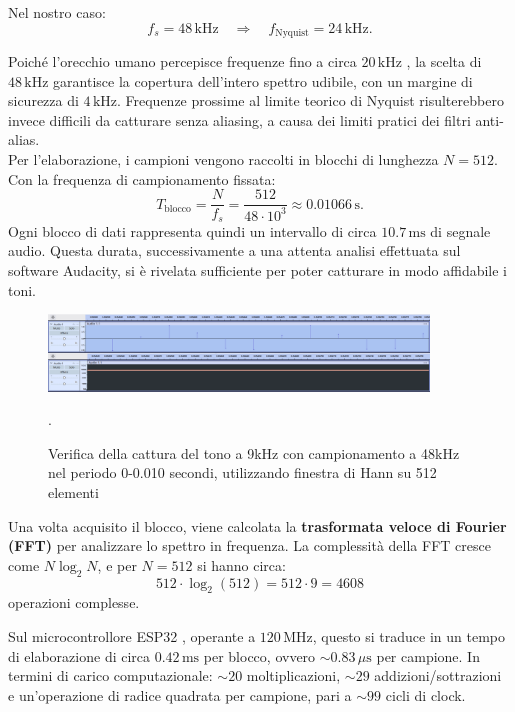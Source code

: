 Nel nostro caso:
\[
f_s = 48\,\text{kHz} \quad \Rightarrow \quad f_{\text{Nyquist}} = 24\,\text{kHz}.
\]

Poiché l’orecchio umano percepisce frequenze fino a circa $20\,\text{kHz}$ \cite{zwicker1999psychoacoustics}, la scelta di $48\,\text{kHz}$ garantisce la copertura dell’intero spettro udibile, con un margine di sicurezza di $4\,\text{kHz}$. Frequenze prossime al limite teorico di Nyquist risulterebbero invece difficili da catturare senza aliasing, a causa dei limiti pratici dei filtri anti-alias. \\

\noindent
Per l’elaborazione, i campioni vengono raccolti in blocchi di lunghezza $N = 512$. Con la frequenza di campionamento fissata:
\[
T_{\text{blocco}} = \frac{N}{f_s} = \frac{512}{48 \cdot 10^3} \approx 0.01066\,\text{s}.
\]
Ogni blocco di dati rappresenta quindi un intervallo di circa $10.7\,\text{ms}$ di segnale audio.  
Questa durata, successivamente a una attenta analisi effettuata sul software Audacity, si è rivelata sufficiente per poter catturare in modo affidabile i toni.
\begin{figure}[H]
    \centering
    \includegraphics[width=0.9\textwidth]{immagini/audacity_spectrum.png}
    \caption{Verifica della cattura del tono a 9kHz con campionamento a 48kHz nel periodo 0-0.010 secondi, utilizzando finestra di Hann su 512 elementi}.
    \label{fig:spettro_audacity}
\end{figure}



\noindent
Una volta acquisito il blocco, viene calcolata la \textbf{trasformata veloce di Fourier (FFT)} \cite{cooley1965fft} per analizzare lo spettro in frequenza. La complessità della FFT cresce come $N \log_2 N$, e per $N=512$ si hanno circa:
\[
512 \cdot \log_2(512) = 512 \cdot 9 = 4608
\]
operazioni complesse.  

Sul microcontrollore ESP32 \cite{esp32techref}, operante a $120\,\text{MHz}$, questo si traduce in un tempo di elaborazione di circa $0.42\,\text{ms}$ per blocco, ovvero $\sim 0.83\,\mu\text{s}$ per campione. In termini di carico computazionale: $\sim 20$ moltiplicazioni, $\sim 29$ addizioni/sottrazioni e un’operazione di radice quadrata per campione, pari a $\sim 99$ cicli di clock.  

